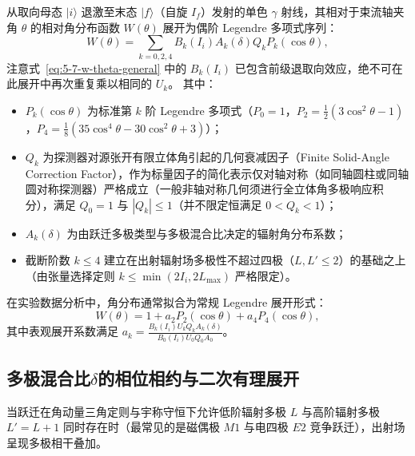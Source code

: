 从取向母态 $|i\rangle$ 退激至末态 $|f\rangle$（自旋 $I_f$）发射的单色 $\gamma$ 射线，其相对于束流轴夹角 $\theta$ 的相对角分布函数 $W(\theta)$ 展开为偶阶 Legendre 多项式序列：
\begin{equation}\label{eq:5-7-w-theta-general}
W(\theta) = \sum_{k=0, 2, 4} B_k(I_i) A_k(\delta) Q_k P_k(\cos\theta),
\end{equation}
注意式~\eqref{eq:5-7-w-theta-general} 中的 $B_k(I_i)$ 已包含前级退取向效应，绝不可在此展开中再次重复乘以相同的 $U_k$。
其中：
\begin{itemize}
\item $P_k(\cos\theta)$ 为标准第 $k$ 阶 Legendre 多项式（$P_0 = 1$，$P_2 = \frac{1}{2}(3\cos^2\theta - 1)$，$P_4 = \frac{1}{8}(35\cos^4\theta - 30\cos^2\theta + 3)$）；
\item $Q_k$ 为探测器对源张开有限立体角引起的几何衰减因子（Finite Solid-Angle Correction Factor），作为标量因子的简化表示仅对轴对称（如同轴圆柱或同轴圆对称探测器）严格成立（一般非轴对称几何须进行全立体角多极响应积分），满足 $Q_0 = 1$ 与 $|Q_k| \le 1$（并不限定恒满足 $0 < Q_k < 1$）；
\item $A_k(\delta)$ 为由跃迁多极类型与多极混合比决定的辐射角分布系数；
\item 截断阶数 $k \le 4$ 建立在出射辐射场多极性不超过四极（$L, L' \le 2$）的基础之上（由张量选择定则 $k \le \min(2I_i, 2L_{\max})$ 严格限定）。
\end{itemize}
在实验数据分析中，角分布通常拟合为常规 Legendre 展开形式：
\begin{equation}\label{eq:5-7-w-theta-fit}
W(\theta) = 1 + a_2 P_2(\cos\theta) + a_4 P_4(\cos\theta),
\end{equation}
其中表观展开系数满足 $a_k = \frac{B_k(I_i) U_k Q_k A_k(\delta)}{B_0(I_i) U_0 Q_0 A_0}$。

\subsection{多极混合比$\delta$的相位相约与二次有理展开}\label{subsec:5-7-2}

当跃迁在角动量三角定则与宇称守恒下允许低阶辐射多极 $L$ 与高阶辐射多极 $L' = L + 1$ 同时存在时（最常见的是磁偶极 $M1$ 与电四极 $E2$ 竞争跃迁），出射场呈现多极相干叠加。

